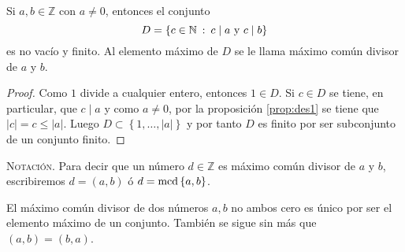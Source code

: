 \begin{proposition}
\label{prop:mcd1}Si $a,b\in \mathbb{Z}$ con $a\neq 0$, entonces el conjunto 
\begin{equation*}
	D=\left\{c\in \mathbb{N} \: : \: c \mid a\textnormal{ y }c \mid b\right\}
\end{equation*}
es no vacío y finito. Al elemento máximo de $D$ se le llama máximo común divisor de $a$ y $b$.
\end{proposition}
\begin{proof}
Como $1$ divide a cualquier entero, entonces $1\in D$. Si $c\in D$ se tiene, en particular, que $c \mid a$ y como $a\neq 0$, por la proposición \eqref{prop:des1} se tiene que $|c|=c\leq |a|$. Luego $D\subset \left\{1,\ldots ,|a|\right\}$ y por tanto $D$ es finito por ser subconjunto de un conjunto finito.
\end{proof}
\bigskip

\textsc{Notación}. Para decir que un número $d\in \mathbb{Z}$ es máximo común divisor de $a$ y $b$, escribiremos $d=(a,b)$ ó $d=\textnormal{mcd}\left\{a,b\right\}$.

\begin{remark}
El máximo común divisor de dos números $a,b$ no ambos cero es único por ser el elemento máximo de un conjunto. También se sigue sin más que $(a,b)=(b,a)$.
\end{remark}

